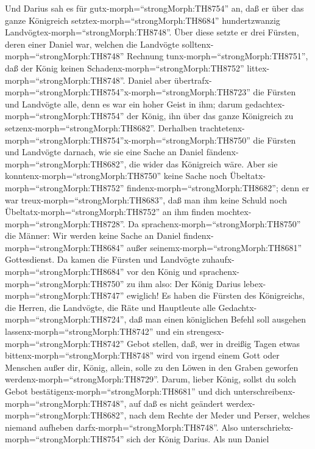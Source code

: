 Und Darius sah es für gutx-morph=``strongMorph:TH8754'' an,
daß er über das ganze Königreich setztex-morph=``strongMorph:TH8684''
hundertzwanzig Landvögtex-morph=``strongMorph:TH8748''. 
Über diese setzte er drei Fürsten, deren einer Daniel war, welchen die
Landvögte solltenx-morph=``strongMorph:TH8748'' Rechnung
tunx-morph=``strongMorph:TH8751'', daß der König keinen
Schadenx-morph=``strongMorph:TH8752''
littex-morph=``strongMorph:TH8748''.  Daniel aber
übertrafx-morph=``strongMorph:TH8754''x-morph=``strongMorph:TH8723'' die
Fürsten und Landvögte alle, denn es war ein hoher Geist in ihm; darum
gedachtex-morph=``strongMorph:TH8754'' der König, ihn über das ganze
Königreich zu setzenx-morph=``strongMorph:TH8682''. 
Derhalben
trachtetenx-morph=``strongMorph:TH8754''x-morph=``strongMorph:TH8750''
die Fürsten und Landvögte darnach, wie sie eine Sache an Daniel
fändenx-morph=``strongMorph:TH8682'', die wider das Königreich wäre.
Aber sie konntenx-morph=``strongMorph:TH8750'' keine Sache noch
Übeltatx-morph=``strongMorph:TH8752''
findenx-morph=``strongMorph:TH8682''; denn er war
treux-morph=``strongMorph:TH8683'', daß man ihm keine Schuld noch
Übeltatx-morph=``strongMorph:TH8752'' an ihm finden
mochtex-morph=``strongMorph:TH8728''.  Da
sprachenx-morph=``strongMorph:TH8750'' die Männer: Wir werden keine
Sache an Daniel findenx-morph=``strongMorph:TH8684'' außer
seinemx-morph=``strongMorph:TH8681'' Gottesdienst.  Da kamen
die Fürsten und Landvögte zuhaufx-morph=``strongMorph:TH8684'' vor den
König und sprachenx-morph=``strongMorph:TH8750'' zu ihm also: Der König
Darius lebex-morph=``strongMorph:TH8747'' ewiglich!  Es
haben die Fürsten des Königreichs, die Herren, die Landvögte, die Räte
und Hauptleute alle Gedachtx-morph=``strongMorph:TH8724'', daß man einen
königlichen Befehl soll ausgehen lassenx-morph=``strongMorph:TH8742''
und ein strengesx-morph=``strongMorph:TH8742'' Gebot stellen, daß, wer
in dreißig Tagen etwas bittenx-morph=``strongMorph:TH8748'' wird von
irgend einem Gott oder Menschen außer dir, König, allein, solle zu den
Löwen in den Graben geworfen werdenx-morph=``strongMorph:TH8729''.
 Darum, lieber König, sollst du solch Gebot
bestätigenx-morph=``strongMorph:TH8681'' und dich
unterschreibenx-morph=``strongMorph:TH8748'', auf daß es nicht geändert
werdex-morph=``strongMorph:TH8682'', nach dem Rechte der Meder und
Perser, welches niemand aufheben darfx-morph=``strongMorph:TH8748''.
 Also unterschriebx-morph=``strongMorph:TH8754'' sich der
König Darius.  Als nun Daniel
